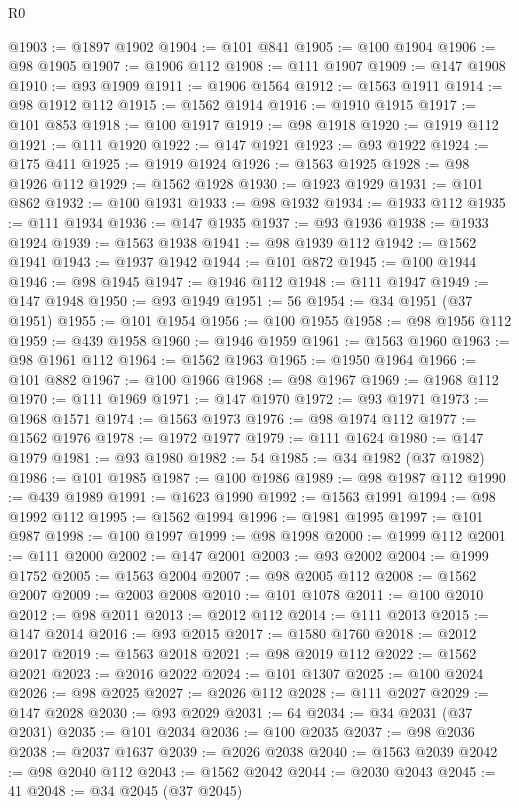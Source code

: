 \begin{lexlean}{R0}
\begin{coremodule}
@1903 := @1897 @1902
@1904 := @101 @841
@1905 := @100 @1904
@1906 := @98 @1905
@1907 := @1906 @112
@1908 := @111 @1907
@1909 := @147 @1908
@1910 := @93 @1909
@1911 := @1906 @1564
@1912 := @1563 @1911
@1914 := @98 @1912 @112
@1915 := @1562 @1914
@1916 := @1910 @1915
@1917 := @101 @853
@1918 := @100 @1917
@1919 := @98 @1918
@1920 := @1919 @112
@1921 := @111 @1920
@1922 := @147 @1921
@1923 := @93 @1922
@1924 := @175 @411
@1925 := @1919 @1924
@1926 := @1563 @1925
@1928 := @98 @1926 @112
@1929 := @1562 @1928
@1930 := @1923 @1929
@1931 := @101 @862
@1932 := @100 @1931
@1933 := @98 @1932
@1934 := @1933 @112
@1935 := @111 @1934
@1936 := @147 @1935
@1937 := @93 @1936
@1938 := @1933 @1924
@1939 := @1563 @1938
@1941 := @98 @1939 @112
@1942 := @1562 @1941
@1943 := @1937 @1942
@1944 := @101 @872
@1945 := @100 @1944
@1946 := @98 @1945
@1947 := @1946 @112
@1948 := @111 @1947
@1949 := @147 @1948
@1950 := @93 @1949
@1951 := 56
@1954 := @34 @1951 (@37 @1951)
@1955 := @101 @1954
@1956 := @100 @1955
@1958 := @98 @1956 @112
@1959 := @439 @1958
@1960 := @1946 @1959
@1961 := @1563 @1960
@1963 := @98 @1961 @112
@1964 := @1562 @1963
@1965 := @1950 @1964
@1966 := @101 @882
@1967 := @100 @1966
@1968 := @98 @1967
@1969 := @1968 @112
@1970 := @111 @1969
@1971 := @147 @1970
@1972 := @93 @1971
@1973 := @1968 @1571
@1974 := @1563 @1973
@1976 := @98 @1974 @112
@1977 := @1562 @1976
@1978 := @1972 @1977
@1979 := @111 @1624
@1980 := @147 @1979
@1981 := @93 @1980
@1982 := 54
@1985 := @34 @1982 (@37 @1982)
@1986 := @101 @1985
@1987 := @100 @1986
@1989 := @98 @1987 @112
@1990 := @439 @1989
@1991 := @1623 @1990
@1992 := @1563 @1991
@1994 := @98 @1992 @112
@1995 := @1562 @1994
@1996 := @1981 @1995
@1997 := @101 @987
@1998 := @100 @1997
@1999 := @98 @1998
@2000 := @1999 @112
@2001 := @111 @2000
@2002 := @147 @2001
@2003 := @93 @2002
@2004 := @1999 @1752
@2005 := @1563 @2004
@2007 := @98 @2005 @112
@2008 := @1562 @2007
@2009 := @2003 @2008
@2010 := @101 @1078
@2011 := @100 @2010
@2012 := @98 @2011
@2013 := @2012 @112
@2014 := @111 @2013
@2015 := @147 @2014
@2016 := @93 @2015
@2017 := @1580 @1760
@2018 := @2012 @2017
@2019 := @1563 @2018
@2021 := @98 @2019 @112
@2022 := @1562 @2021
@2023 := @2016 @2022
@2024 := @101 @1307
@2025 := @100 @2024
@2026 := @98 @2025
@2027 := @2026 @112
@2028 := @111 @2027
@2029 := @147 @2028
@2030 := @93 @2029
@2031 := 64
@2034 := @34 @2031 (@37 @2031)
@2035 := @101 @2034
@2036 := @100 @2035
@2037 := @98 @2036
@2038 := @2037 @1637
@2039 := @2026 @2038
@2040 := @1563 @2039
@2042 := @98 @2040 @112
@2043 := @1562 @2042
@2044 := @2030 @2043
@2045 := 41
@2048 := @34 @2045 (@37 @2045)

\end{coremodule}
\end{lexlean}
